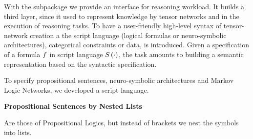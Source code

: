 With the \spapplication subpackage we provide an interface for reasoning workload.
It builds a third layer, since it used \sprepresentation to represent knowledge by tensor networks and \spreasoning in the execution of reasoning tasks.
%
To have a user-friendly high-level syntax of tensor-network creation a the script language (logical formulas or neuro-symbolic architectures), categorical constraints or data, is introduced.
Given a specification of a formula $f$ in script language $S\left(\cdot\right)$, the task amounts to building a semantic representation based on the syntactic specification.

\label{subsec:scriptLanguage}

To specify propositional sentences, neuro-symbolic architectures and Markov Logic Networks, we developed a script language.

\textbf{Propositional Sentences by Nested Lists}

Are those of Propositional Logics, but instead of brackets we nest the symbols into lists.

